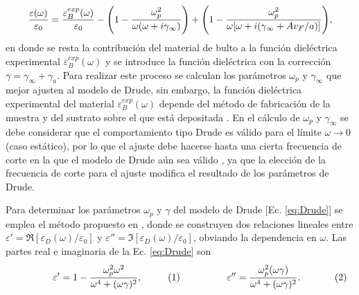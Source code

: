 	\begin{align}
	\frac{\varepsilon(\omega)}{\varepsilon_0} = \frac{\varepsilon_B^{exp}(\omega)}{\varepsilon_0}
						 - \qty( 1 - \frac{\omega_p^2}{\omega(\omega+i\gamma_\infty)}) 
						 + \qty( 1 - \frac{\omega_p^2}{\omega[\omega+i(\gamma_\infty + Av_F/a)]}),
			\label{eq:sizeCorrection}
	\end{align}
en donde se resta la contribución del material de bulto  a la función dieléctrica experimental $ \varepsilon_B^{exp}(\omega)$ y se introduce la función dieléctrica con la corrección $\gamma = \gamma_\infty+\gamma_a$. Para realizar este proceso se calculan los parámetros $\omega_p$ y $\gamma_\infty$ que mejor ajusten al modelo de Drude, sin embargo, la función dieléctrica experimental del material $\varepsilon_B^{exp}(\omega)$ depende del método de fabricación de la muestra y del sustrato sobre el que está depositada \cite{svetovoy2008optical}. En el cálculo de $\omega_p$ y $\gamma_\infty$ se debe considerar que el comportamiento tipo Drude es válido para el límite $\omega\to 0$ (caso estático), por lo que el ajuste debe hacerse hasta una cierta frecuencia de corte en la que el modelo de Drude aún sea válido \cite{mendoza2014determination}, ya que la elección de la frecuencia de corte para el ajuste modifica el resultado de los parámetros de Drude.

Para determinar los parámetros $\omega_p$ y $\gamma$ del modelo de Drude [Ec. \eqref{eq:Drude}] se emplea el método propuesto en \cite{mendoza2014determination}, donde se construyen dos relaciones lineales entre $\varepsilon' = \Re[\varepsilon_D(\omega)/\varepsilon_0]$ y $\varepsilon''=\Im[\varepsilon_D(\omega)/\varepsilon_0]$, obviando la dependencia en $\omega$. Las partes real e imaginaria de la Ec. \eqref{eq:Drude} son \vspace*{-1em}\begin{subequations}

	\eqhalf{\varepsilon' =
		 1 - \frac{\omega_p^2 \omega^2}{\omega^4 + (\omega\gamma)^2},
		 \label{eqs:ReDrude}}
	\eqhalf{\varepsilon'' =
		 \frac{\omega_p^2  (\omega\gamma)}{\omega^4 + (\omega\gamma)^2}.
		 \label{eqs:ImDrude}
			}\end{subequations} 
			
